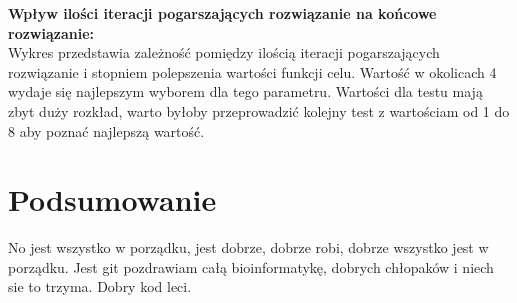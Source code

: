 \documentclass{article}
\begin{document}
\large\textbf{Wpływ ilości iteracji pogarszających rozwiązanie na końcowe rozwiązanie:}\normalsize\\
Wykres przedstawia zależność pomiędzy ilością iteracji pogarszających rozwiązanie
i stopniem polepszenia wartości funkcji celu. Wartość w okolicach 4 wydaje się
najlepszym wyborem dla tego parametru. Wartości dla testu mają zbyt duży rozkład,
warto byłoby przeprowadzić kolejny test z wartościam od 1 do 8 aby poznać
najlepszą wartość.


\begin{center}
\end{center}


\section{Podsumowanie}
No jest wszystko w porządku, jest dobrze, dobrze robi, dobrze wszystko jest w porządku.
Jest git pozdrawiam całą bioinformatykę, dobrych chłopaków i niech sie to trzyma.
Dobry kod leci.
\end{document}
